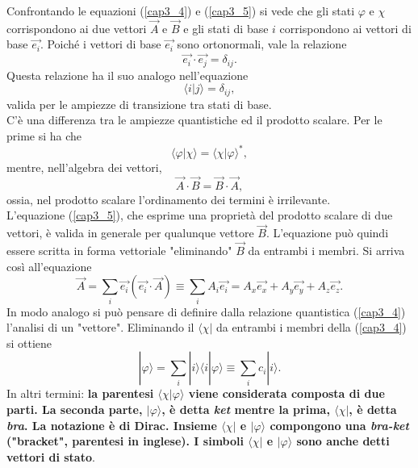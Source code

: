 Confrontando le equazioni (\ref{cap3_4}) e (\ref{cap3_5}) si vede che gli stati $\varphi$ e $\chi$ corrispondono ai due vettori $\vec{A}$ e $\vec{B}$ e gli stati di base $i$ corrispondono ai vettori di base $\vec{e_i}$. Poiché i vettori di base $\vec{e_i}$ sono ortonormali, vale la relazione
	\begin{equation}
		\vec{e_i} \cdot \vec{e_j}= \delta_{ij} .
	\end{equation}
Questa relazione ha il suo analogo nell'equazione
	\begin{equation}
		\langle i | j \rangle = \delta_{ij} ,
	\end{equation}
valida per le ampiezze di transizione tra stati di base.\\
C'è una differenza tra le ampiezze quantistiche ed il prodotto scalare. Per le prime si ha che
	\begin{equation}
		\langle \varphi | \chi \rangle = \langle \chi | \varphi\rangle ^* ,
	\label{cap3_6}
	\end{equation} 
mentre, nell'algebra dei vettori, 
	\begin{equation}
		\vec{A} \cdot \vec{B}= \vec{B} \cdot \vec{A} ,
	\label{cap3_7}
	\end{equation}
ossia, nel prodotto scalare l'ordinamento dei termini è irrilevante.\\

L'equazione (\ref{cap3_5}), che esprime una proprietà del prodotto scalare di due vettori, è valida in generale per qualunque vettore $\vec{B}$. L'equazione può quindi essere scritta in forma vettoriale "eliminando" $\vec{B}$ da entrambi i membri. Si arriva così all'equazione 
	\begin{equation}
		\vec{A} = \sum \limits_{i} \vec{e_i} (\vec{e_i}\cdot\vec{A}) \equiv \sum \limits_{i} A_i\vec{e_i}= A_x\vec{e_x}+A_y\vec{e_y}+A_z\vec{e_z} .
	\end{equation}
In modo analogo si può pensare di definire dalla relazione quantistica (\ref{cap3_4}) l'analisi di un "vettore". Eliminando il $\langle \chi |$ da entrambi i membri della (\ref{cap3_4}) si ottiene
	\begin{equation}
		\boxed{\boxed{
 			| \varphi \rangle= \sum \limits_{i} | i \rangle \langle i | \varphi \rangle \equiv \sum \limits_{i} c_i | i \rangle .
 			}}
	\label{cap3_8}
	\end{equation}
In altri termini: \textbf{la parentesi $\langle \chi | \varphi \rangle $ viene considerata composta di due parti. La seconda parte, $| \varphi \rangle $, è detta \emph{ket} mentre la prima, $\langle \chi |$, è detta \emph{bra}. La notazione è di Dirac. Insieme $\langle \chi |$ e $| \varphi \rangle$ compongono una \emph{bra-ket} ("bracket", parentesi in inglese). I simboli $\langle \chi |$ e $| \varphi \rangle$ sono anche detti vettori di stato}.\\

